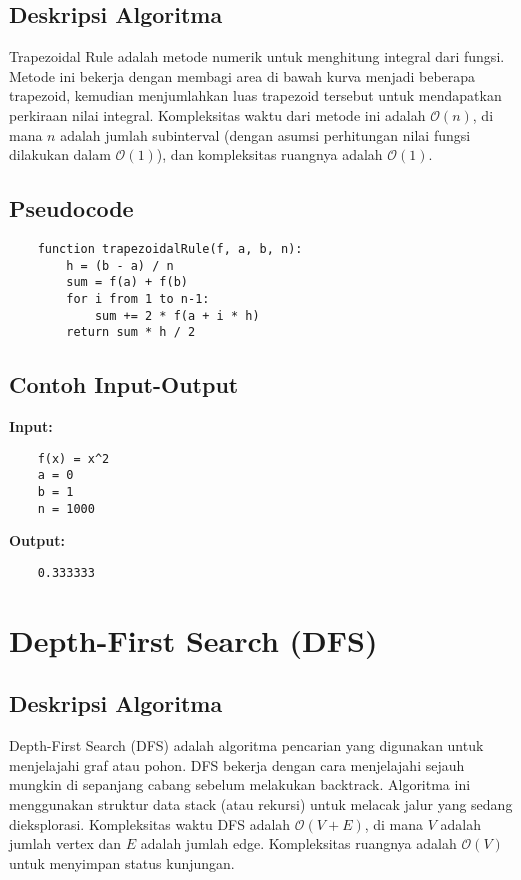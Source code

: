\subsection{Deskripsi Algoritma}
Trapezoidal Rule adalah metode numerik untuk menghitung integral dari fungsi. Metode ini bekerja dengan membagi area di bawah kurva menjadi beberapa trapezoid, kemudian menjumlahkan luas trapezoid tersebut untuk mendapatkan perkiraan nilai integral. Kompleksitas waktu dari metode ini adalah $\mathcal{O}(n)$, di mana $n$ adalah jumlah subinterval (dengan asumsi perhitungan nilai fungsi dilakukan dalam $\mathcal{O}(1)$), dan kompleksitas ruangnya adalah $\mathcal{O}(1)$.

\subsection{Pseudocode}
\begin{verbatim}
    function trapezoidalRule(f, a, b, n):
        h = (b - a) / n
        sum = f(a) + f(b)
        for i from 1 to n-1:
            sum += 2 * f(a + i * h)
        return sum * h / 2
\end{verbatim}

\subsection{Contoh Input-Output}
\textbf{Input:}
\begin{verbatim}
    f(x) = x^2
    a = 0
    b = 1
    n = 1000
\end{verbatim}

\textbf{Output:}
\begin{verbatim}
    0.333333
\end{verbatim}

\section{Depth-First Search (DFS)}
\label{sec:dfs-implementation}

\subsection{Deskripsi Algoritma}
Depth-First Search (DFS) adalah algoritma pencarian yang digunakan untuk menjelajahi graf atau pohon. DFS bekerja dengan cara menjelajahi sejauh mungkin di sepanjang cabang sebelum melakukan backtrack. Algoritma ini menggunakan struktur data stack (atau rekursi) untuk melacak jalur yang sedang dieksplorasi. Kompleksitas waktu DFS adalah $\mathcal{O}(V + E)$, di mana $V$ adalah jumlah vertex dan $E$ adalah jumlah edge. Kompleksitas ruangnya adalah $\mathcal{O}(V)$ untuk menyimpan status kunjungan.

